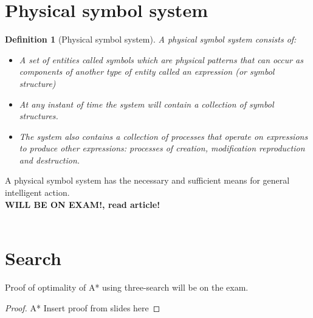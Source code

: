 \documentclass[a4paper]{article}
\newtheorem{definition}{Definition}[section]
\begin{document}
\section{Physical symbol system}
\begin{definition}[Physical symbol system]
  A physical symbol system consists of:
  \begin{itemize}
    \item A set of entities called symbols which are physical patterns that can
      occur as components of another type of entity called an expression (or
      symbol structure)
    \item At any instant of time the system will contain a collection of symbol
      structures.
    \item The system also contains a collection of processes that operate on
      expressions to produce other expressions: processes of creation,
      modification reproduction and destruction.
  \end{itemize}
  
\end{definition}
A physical symbol system has the necessary and sufficient means for general
intelligent action.
\\
\textbf{WILL BE ON EXAM!, read article!}
\\
\\

\section{Search}

Proof of optimality of A* using three-search will be on the exam.

\begin{proof}{A*}
  Insert proof from slides here
\end{proof} 
\end{document}
